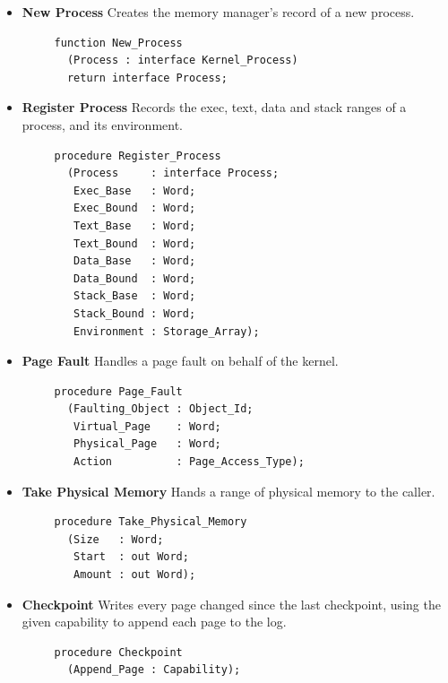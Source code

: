 \begin{itemize}
    \item \textbf{New Process} Creates the memory manager's record of a new process.

    \begin{verbatim}
     function New_Process
       (Process : interface Kernel_Process)
       return interface Process;
    \end{verbatim}

    \item \textbf{Register Process} Records the exec, text, data and stack ranges of a process, and its environment.

    \begin{verbatim}
     procedure Register_Process
       (Process     : interface Process;
        Exec_Base   : Word;
        Exec_Bound  : Word;
        Text_Base   : Word;
        Text_Bound  : Word;
        Data_Base   : Word;
        Data_Bound  : Word;
        Stack_Base  : Word;
        Stack_Bound : Word;
        Environment : Storage_Array);
    \end{verbatim}

    \item \textbf{Page Fault} Handles a page fault on behalf of the kernel.

    \begin{verbatim}
     procedure Page_Fault
       (Faulting_Object : Object_Id;
        Virtual_Page    : Word;
        Physical_Page   : Word;
        Action          : Page_Access_Type);
    \end{verbatim}

    \item \textbf{Take Physical Memory} Hands a range of physical memory to the caller.

    \begin{verbatim}
     procedure Take_Physical_Memory
       (Size   : Word;
        Start  : out Word;
        Amount : out Word);
    \end{verbatim}

    \item \textbf{Checkpoint} Writes every page changed since the last checkpoint, using the given capability to append each page to the log.

    \begin{verbatim}
     procedure Checkpoint
       (Append_Page : Capability);
    \end{verbatim}
\end{itemize}


